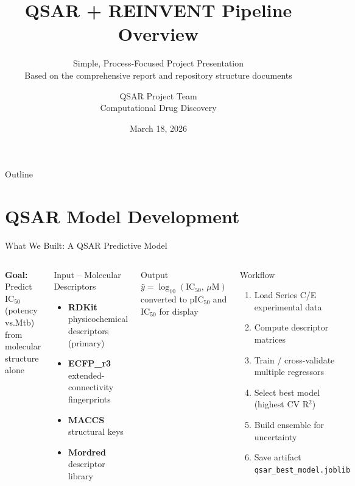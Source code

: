 \documentclass[aspectratio=169]{beamer}
\title{QSAR + REINVENT Pipeline Overview}
\subtitle{Simple, Process-Focused Project Presentation \\ {\small Based on the comprehensive report and repository structure documents}}
\author{QSAR Project Team \\ Computational Drug Discovery}
\date{March 18, 2026}
\institute{}
\begin{document}
\begin{frame}
  \titlepage
\end{frame}

\begin{frame}{Outline}
  \tableofcontents
\end{frame}

\section{QSAR Model Development}

\begin{frame}{What We Built: A QSAR Predictive Model}
  \begin{columns}
    \textbf{Goal:} Predict IC$_{50}$ (potency vs.\@ Mtb) from molecular structure alone
    \vspace{0.4em}
    \begin{block}{Input -- Molecular Descriptors}
      \small
      \begin{itemize}
        \item \textbf{RDKit} physicochemical descriptors (primary)
        \item \textbf{ECFP\_r3} extended-connectivity fingerprints
        \item \textbf{MACCS} structural keys
        \item \textbf{Mordred} descriptor library
      \end{itemize}
    \end{block}
    \vspace{0.3em}
    \begin{block}{Output}
      \small
      $\hat{y} = \log_{10}(\text{IC}_{50},\,\mu\text{M})$\\
      converted to pIC$_{50}$ and IC$_{50}$ for display
    \end{block}
    \begin{block}{Workflow}
      \small
      \begin{enumerate}
        \item Load Series C/E experimental data
        \item Compute descriptor matrices
        \item Train / cross-validate multiple regressors
        \item Select best model (highest CV R$^2$)
        \item Build ensemble for uncertainty
        \item Save artifact \texttt{qsar\_best\_model.joblib}
      \end{enumerate}
    \end{block}
  \end{columns}
\end{frame}
\end{document}
